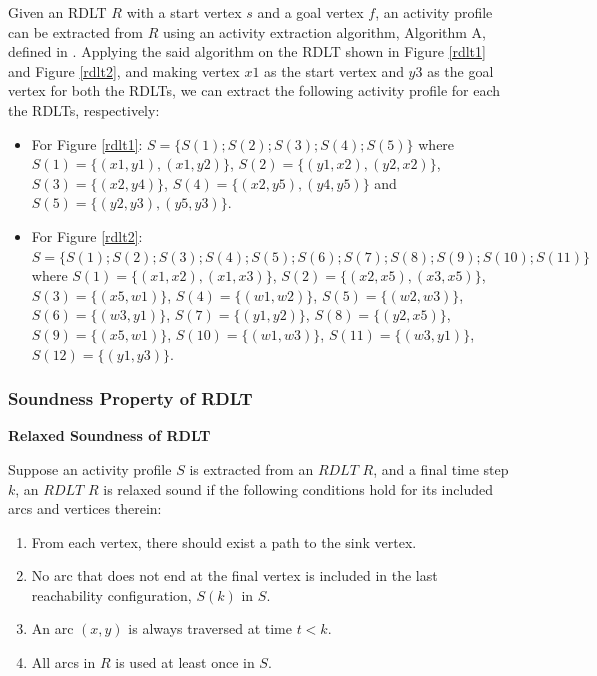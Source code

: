 \documentclass[12pt]{article}
\begin{document}
    Given an RDLT $R$ with a start vertex $s$ and a goal vertex $f$, an activity profile can be extracted from $R$ using an activity extraction algorithm, Algorithm A, defined in \cite{malinao-rdlt}. Applying the said algorithm on the RDLT shown in Figure \ref{rdlt1} and Figure \ref{rdlt2}, and making vertex $x1$ as the start vertex and $y3$ as the goal vertex for both the RDLTs, we can extract the following activity profile for each the RDLTs, respectively:

    \begin{itemize}

        \item For Figure \ref{rdlt1}: $S = \{S(1);S(2);S(3);S(4);S(5)\}$ where $S(1) = \{(x1,y1),(x1,y2)\}$, $S(2) = \{(y1,x2),(y2,x2)\}$, $S(3) = \{(x2,y4)\}$, $S(4) = \{(x2,y5),(y4,y5)\}$ and $S(5) = \{(y2,y3),(y5,y3)\}$.

        \item For Figure \ref{rdlt2}: $S = \{S(1);S(2);S(3);S(4);S(5);S(6);S(7);S(8);S(9);S(10);S(11)\}$ where $S(1) = \{(x1,x2),(x1,x3)\}$, $S(2) = \{(x2,x5),(x3,x5)\}$, $S(3) = \{(x5,w1)\}$, $S(4) = \{(w1,w2)\}$, $S(5) = \{(w2,w3)\}$, $S(6) = \{(w3,y1)\}$, $S(7) = \{(y1,y2)\}$, $S(8) = \{(y2,x5)\}$, $S(9) = \{(x5,w1)\}$, $S(10) = \{(w1,w3)\}$, $S(11) = \{(w3,y1)\}$, $S(12) = \{(y1,y3)\}$.

    \end{itemize}

    \subsubsection*{Soundness Property of RDLT}

    \begin{definition} \textbf{Relaxed Soundness of RDLT} \cite{malinao-rdlt}

    Suppose an activity profile $S$ is extracted from an $RDLT$ $R$, and a final time step $k$, an $RDLT$ $R$ is relaxed sound if the following conditions hold for its included arcs and vertices therein:

    \begin{enumerate}

        \item From each vertex, there should exist a path to the sink vertex.

        \item No arc that does not end at the final vertex is included in the last reachability configuration, $S(k)$ in $S$.

        \item An arc $(x,y)$ is always traversed at time $t < k$.

        \item All arcs in $R$ is used at least once in $S$.

    \end{enumerate}

    \end{definition}
\end{document}
